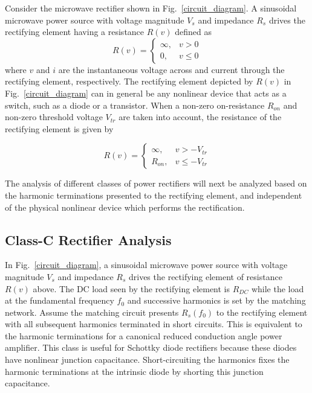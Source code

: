 \documentclass[journal]{IEEEtran}
\begin{document}
Consider the microwave rectifier shown in Fig.~\ref{circuit_diagram}.  A sinusoidal microwave power source with voltage magnitude $V_s$ and impedance $R_s$ drives the rectifying element having a resistance $R(v)$ defined as
\begin{equation}\label{ideal_rectifier_resistance}
R(v) =
\begin{cases}
    \infty, & v > 0\\
    0, & v \leq 0
\end{cases}
\end{equation}
where $v$ and $i$ are the instantaneous voltage across and current through the rectifying element, respectively. The rectifying element depicted by $R(v)$ in Fig.~\ref{circuit_diagram} can in general be any nonlinear device that acts as a switch, such as a diode or a transistor. When a non-zero on-resistance $R_{on}$ and non-zero threshold voltage $V_{tr}$ are taken into account, the resistance of the rectifying element is given by

\begin{equation}\label{nonideal_rectifier_resistance}
R(v) =
\begin{cases}
    \infty, & v > -V_{tr}\\
    R_{on}, & v \leq -V_{tr}
\end{cases}
\end{equation}

The analysis of different classes of power rectifiers will next be analyzed based on the harmonic terminations presented to the rectifying element, and independent of the physical nonlinear device which performs the rectification.









\subsection {Class-C Rectifier Analysis}

In Fig.~\ref{circuit_diagram}, a sinusoidal microwave power source with voltage magnitude $V_s$ and impedance $R_s$ drives the rectifying element of resistance $R(v)$ above. The DC load seen by the rectifying element is $R_{DC}$ while the load at the fundamental frequency $f_0$ and successive harmonics is set by the matching network. Assume the matching circuit presents $R_s(f_0)$ to the rectifying element with all subsequent harmonics terminated in short circuits. This is equivalent to the harmonic terminations for a canonical reduced conduction angle power amplifier. This class is useful for Schottky diode rectifiers because these diodes have nonlinear junction capacitance. Short-circuiting the harmonics fixes the harmonic terminations at the intrinsic diode by shorting this junction capacitance.
\end{document}
